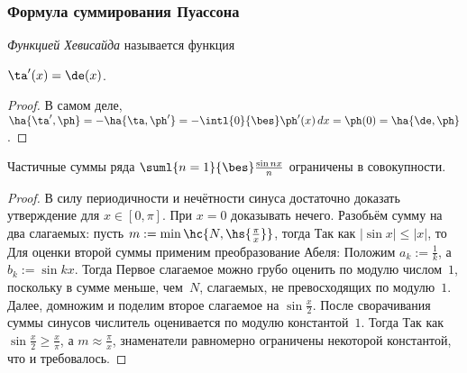 \documentclass[a4paper]{article}
\newcommand{\dx}{\,dx}
\begin{document}
\subsubsection{Формула суммирования Пуассона}

\begin{df}
\emph{Функцией Хевисайда} называется функция
\end{df}

\begin{lemma}
$\ta'(x) = \de(x)$.
\end{lemma}
\begin{proof}
В самом деле, $\ha{\ta',\ph} = -\ha{\ta,\ph'} = -\intl{0}{\bes}\ph'(x)\dx = \ph(0) = \ha{\de,\ph}$.
\end{proof}

\begin{lemma}
Частичные суммы ряда $\suml{n=1}{\bes}\frac{\sin nx}{n}$ ограничены в совокупности.
\end{lemma}
\begin{proof}
В силу периодичности и нечётности синуса достаточно доказать утверждение для $x\in[0,\pi]$. При $x = 0$ доказывать нечего.
Разобьём сумму на два слагаемых:
пусть $m := \min\hc{N, \hs{\frac\pi x}}$, тогда
Так как $|\sin x| \le |x|$, то
Для оценки второй суммы применим преобразование Абеля:
Положим $a_k := \frac1k$, а $b_k := \sin kx$. Тогда
Первое слагаемое можно грубо оценить по модулю числом~$1$, поскольку в сумме меньше, чем~$N$, слагаемых,
не превосходящих по модулю~$1$. Далее, домножим и поделим второе слагаемое на $\sin\frac x2$.
После сворачивания суммы синусов числитель оценивается по модулю константой~$1$. Тогда
Так как $\sin \frac x2 \ge \frac x\pi$, а $m \approx \frac{\pi}{x}$, знаменатели равномерно ограничены некоторой константой, что и требовалось.
\end{proof}
\end{document}
